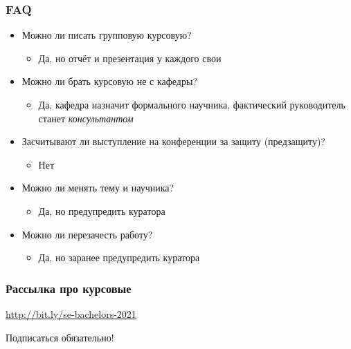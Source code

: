 \documentclass[xetex,mathserif,serif]{beamer}
\begin{document}
	\begin{frame}
		\frametitle{FAQ}
		\begin{itemize}
			\item Можно ли писать групповую курсовую?
			\begin{itemize}
				\item Да, но отчёт и презентация у каждого свои
			\end{itemize}
			\item Можно ли брать курсовую не с кафедры?
			\begin{itemize}
				\item Да, кафедра назначит формального научника, фактический руководитель станет \textit{консультантом}
			\end{itemize}
			\item Засчитывают ли выступление на конференции за защиту (предзащиту)?
			\begin{itemize}
				\item Нет
			\end{itemize}
			\item Можно ли менять тему и научника?
			\begin{itemize}
				\item Да, но предупредить куратора
			\end{itemize}
			\item Можно ли перезачесть работу?
			\begin{itemize}
				\item Да, но заранее предупредить куратора
			\end{itemize}
		\end{itemize}
	\end{frame}

	\begin{frame}
		\frametitle{Рассылка про курсовые}
		\begin{Large}
			\begin{center}
				\url{http://bit.ly/se-bachelors-2021}

				Подписаться обязательно!
			\end{center}
		\end{Large}
	\end{frame}
\end{document}
